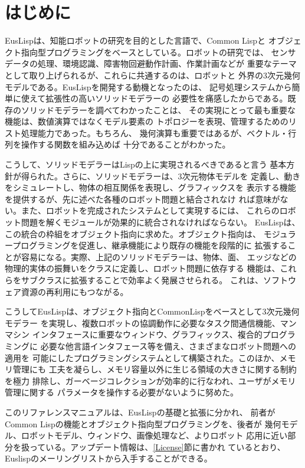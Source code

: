 \section{はじめに}
EusLispは、知能ロボットの研究を目的とした言語で、Common Lispと
オブジェクト指向型プログラミングをベースとしている。ロボットの研究では、
センサデータの処理、環境認識、障害物回避動作計画、作業計画などが
重要なテーマとして取り上げられるが、これらに共通するのは、ロボットと
外界の3次元幾何モデルである。EusLispを開発する動機となったのは、
記号処理システムから簡単に使えて拡張性の高いソリッドモデラーの
必要性を痛感したからである。既存のソリッドモデラーを調べてわかったことは、
その実現にとって最も重要な機能は、数値演算ではなくモデル要素の
トポロジーを表現、管理するためのリスト処理能力であった。もちろん、
幾何演算も重要ではあるが、ベクトル・行列を操作する関数を組み込めば
十分であることがわかった。

こうして、ソリッドモデラーはLispの上に実現されるべきであると言う
基本方針が得られた。さらに、ソリッドモデラーは、3次元物体モデルを
定義し、動きをシミュレートし、物体の相互関係を表現し、グラフィックスを
表示する機能を提供するが、先に述べた各種のロボット問題と結合されなけ
れば意味がない。また、ロボットを完成されたシステムとして実現するには、
これらのロボット問題を解くモジュールが効果的に統合されなければならない。
EusLispは、この統合の枠組をオブジェクト指向に求めた。オブジェクト指向は、
モジュラープログラミングを促進し、継承機能により既存の機能を段階的に
拡張することが容易になる。実際、上記のソリッドモデラーは、物体、面、
エッジなどの物理的実体の振舞いをクラスに定義し、ロボット問題に依存する
機能は、これらをサブクラスに拡張することで効率よく発展させられる。
これは、ソフトウェア資源の再利用にもつながる。

こうしてEusLispは、オブジェクト指向とCommonLispをベースとして3次元幾何モデラー
を実現し、複数ロボットの協調動作に必要なタスク間通信機能、マンマシン
インタフェースに重要なウィンドウ、グラフィックス、複合的プログラミングに
必要な他言語インタフェース等を備え、さまざまなロボット問題への適用を
可能にしたプログラミングシステムとして構築された。このほか、メモリ管理にも
工夫を凝らし、メモリ容量以外に生じる領域の大きさに関する制約を極力
排除し、ガーベージコレクションが効率的に行なわれ、ユーザがメモリ管理に関する
パラメータを操作する必要がないように努めた。

このリファレンスマニュアルは、EusLispの基礎と拡張に分かれ、
前者がCommon Lispの機能とオブジェクト指向型プログラミングを、後者が
幾何モデル、ロボットモデル、ウィンドウ、画像処理など、よりロボット
応用に近い部分を扱っている。アップデート情報は、\ref{License}節に書かれ
ているとおり、Euslispのメーリングリストから入手することができる。


